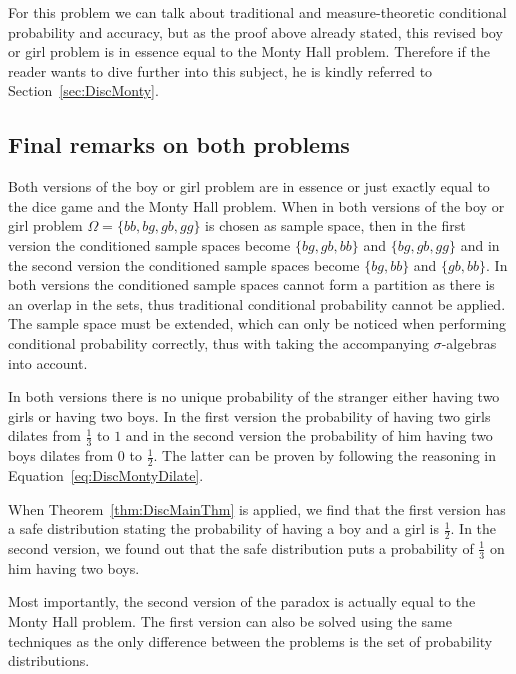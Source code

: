 \documentclass[a4paper]{report}
\theoremstyle{plain}
\theoremstyle{definition}
\theoremstyle{remark}
\numberwithin{equation}{chapter}
\DeclareMathOperator{\1}{\mathbbm{1}}
\begin{document}
For this problem we can talk about traditional and measure-theoretic conditional probability and accuracy, but as the proof above already stated, this revised boy or girl problem is in essence equal to the Monty Hall problem. Therefore if the reader wants to dive further into this subject, he is kindly referred to Section~\ref{sec:DiscMonty}.

\subsection{Final remarks on both problems}
Both versions of the boy or girl problem are in essence or just exactly equal to the dice game and the Monty Hall problem. When in both versions of the boy or girl problem $\Omega=\{bb,bg,gb,gg\}$ is chosen as sample space, then in the first version the conditioned sample spaces become $\{bg, gb, bb\}$ and $\{bg, gb, gg\}$ and in the second version the conditioned sample spaces become $\{bg, bb\}$ and $\{gb, bb\}$. In both versions the conditioned sample spaces cannot form a partition as there is an overlap in the sets, thus traditional conditional probability cannot be applied. The sample space must be extended, which can only be noticed when performing conditional probability correctly, thus with taking the accompanying $\sigma$-algebras into account.

In both versions there is no unique probability of the stranger either having two girls or having two boys. In the first version the probability of having two girls dilates from $\frac{1}{3}$ to $1$ and in the second version the probability of him having two boys dilates from $0$ to $\frac{1}{2}$. The latter can be proven by following the reasoning in Equation~\ref{eq:DiscMontyDilate}.

When Theorem~\ref{thm:DiscMainThm} is applied, we find that the first version has a safe distribution stating the probability of having a boy and a girl is $\frac{1}{2}$. In the second version, we found out that the safe distribution puts a probability of $\frac{1}{3}$ on him having two boys.

Most importantly, the second version of the paradox is actually equal to the Monty Hall problem. The first version can also be solved using the same techniques as the only difference between the problems is the set of probability distributions.
\end{document}
